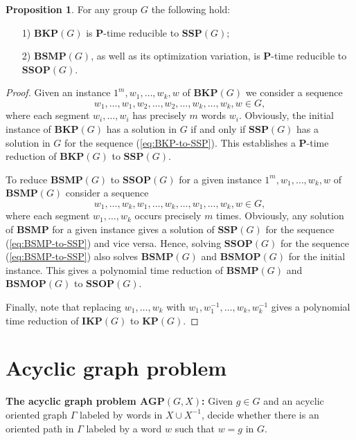\documentclass[10pt]{amsart}
\theoremstyle{definition}
\newtheorem{proposition}[theorem]{Proposition}
\def\P{{\mathbf{P}}}
\def\SSP{{\mathbf{SSP}}}
\def\BSMP{{\mathbf{BSMP}}}
\def\BKP{{\mathbf{BKP}}}
\def\KP{{\mathbf{KP}}}
\def\IKP{{\mathbf{IKP}}}
\def\SSOP{{\mathbf{SSOP}}}
\def\BSMOP{{\mathbf{BSMOP}}}
\def\AGP{{\mathbf{AGP}}}
\begin{document}
\begin{proposition}
\label{pr:SSP-BKP}
For any group $G$ the following hold:
\begin{itemize}
\item [1)] $\BKP(G)$ is  $\P$-time reducible to $\SSP(G)$;
\item [2)] $\BSMP(G)$, as well as its optimization variation,  is $\P$-time reducible to $\SSOP(G)$.

\end{itemize}
\end{proposition}
\begin{proof}
Given an instance $1^m,w_1,\ldots,w_k,w$ of $\BKP(G)$ we consider a sequence
   \begin{equation} \label{eq:BKP-to-SSP}
   w_1,  \ldots,w_1, w_2, \ldots, w_2,  \ldots, w_k, \ldots,w_k, w \in G,
   \end{equation}
   where each segment $w_i, \ldots, w_i$ has precisely $m$ words $w_i$.
Obviously, the initial instance of $\BKP(G)$ has a solution in $G$ if and only if  $\SSP(G)$ has a solution in $G$ for the  sequence (\ref{eq:BKP-to-SSP}). This establishes a $\P$-time reduction of $\BKP(G)$ to $\SSP(G)$.

To reduce $\BSMP(G)$ to $\SSOP(G)$ for a given instance  $1^m,w_1,\ldots,w_k,w$ of $\BSMP(G)$ consider a sequence
\begin{equation} \label{eq:BSMP-to-SSP}
   w_1,  \ldots, w_k, w_1, \ldots, w_k,  \ldots, w_1, \ldots, w_k, w \in G,
   \end{equation}
where each segment $w_1,  \ldots, w_k$ occurs precisely $m$ times. Obviously, any solution of $\BSMP$ for a given instance gives a solution of $\SSP(G)$ for the sequence (\ref{eq:BSMP-to-SSP}) and vice versa. Hence, solving $\SSOP(G)$ for the sequence (\ref{eq:BSMP-to-SSP}) also solves $\BSMP(G)$  and  $\BSMOP(G)$ for the initial instance. This gives a  polynomial time reduction of $\BSMP(G)$ and $\BSMOP(G)$  to $\SSOP(G)$.

Finally, note that replacing $w_1,\ldots, w_k$ with
$w_1,w_1^{-1},\ldots, w_k,w_k^{-1}$ gives a polynomial time reduction of $\IKP(G)$ to $\KP(G)$.

\end{proof}

\section{Acyclic graph problem}\label{sec:agp}
\medskip
\noindent
{\bf The acyclic graph problem $\AGP(G,X)$\index{$\AGP(G,X)$}:} Given $g\in G$ and an acyclic oriented graph $\Gamma$ labeled by words in $X\cup X^{-1}$, decide whether there is an oriented path in $\Gamma$ labeled by a word $w$ such that $w=g$ in $G$.
\end{document}
